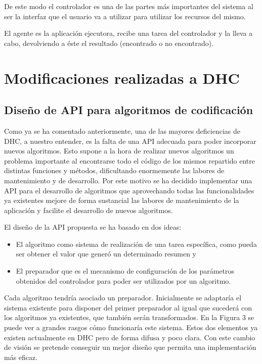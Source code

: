 De este modo el controlador es una de las partes más importantes del sistema al ser la interfaz que el usuario va a utilizar para utilizar los recursos del mismo.

El agente es la aplicación ejecutora, recibe una tarea del controlador y la lleva a cabo, devolviendo a éste el resultado (encontrado o no encontrado).

\section{Modificaciones realizadas a DHC}

\subsection{Diseño de API para algoritmos de codificación}

Como ya se ha comentado anteriormente, una de las mayores deficiencias de DHC, a nuestro entender, es la falta de una API adecuada para poder incorporar nuevos algoritmos. Esto supone a la hora de realizar nuevos algoritmos un problema importante al encontrarse todo el código de los mismos repartido entre distintas funciones y métodos, dificultando enormemente las labores de mantenimiento y de desarrollo. Por este motivo se ha decidido implementar una API para el desarrollo de algoritmos que aprovechando todas las funcionalidades ya existentes mejore de forma sustancial las labores de mantenimiento de la aplicación y facilite el desarrollo de nuevos algoritmos.

El diseño de la API propuesta se ha basado en dos ideas:
\begin{itemize}
	\item El algoritmo como sistema de realización de una tarea específica, como pueda ser obtener el valor que generó un determinado resumen y
	\item El preparador que es el mecanismo de configuración de los parámetros obtenidos del controlador para poder ser utilizados por un algoritmo.
\end{itemize}

Cada algoritmo tendría asociado un preparador. Inicialmente se adaptaría el sistema existente para disponer del primer preparador al igual que sucederá con los algoritmos ya existentes, que también serán transformados. En la Figura 3 se puede ver a grandes rasgos cómo funcionaría este sistema.
Estos dos elementos ya existen actualmente en DHC pero de forma difusa y poco clara. Con este cambio de visión se pretende conseguir un mejor diseño que permita una implementación más eficaz.
 
